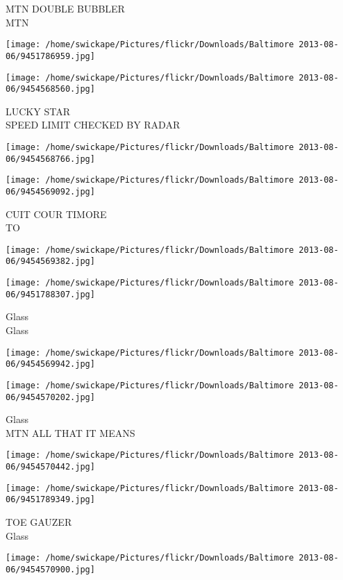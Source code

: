 \documentclass[10pt,letterpaper]{article}
\begin{document}
MTN DOUBLE BUBBLER\\
MTN
\pagebreak

\texttt{[image: /home/swickape/Pictures/flickr/Downloads/Baltimore 2013-08-06/9451786959.jpg]}

\vspace{0.25in}
\texttt{[image: /home/swickape/Pictures/flickr/Downloads/Baltimore 2013-08-06/9454568560.jpg]}

LUCKY STAR\\
SPEED LIMIT CHECKED BY RADAR
\pagebreak

\texttt{[image: /home/swickape/Pictures/flickr/Downloads/Baltimore 2013-08-06/9454568766.jpg]}

\vspace{0.25in}
\texttt{[image: /home/swickape/Pictures/flickr/Downloads/Baltimore 2013-08-06/9454569092.jpg]}

CUIT COUR TIMORE\\
TO
\pagebreak

\texttt{[image: /home/swickape/Pictures/flickr/Downloads/Baltimore 2013-08-06/9454569382.jpg]}

\vspace{0.25in}
\texttt{[image: /home/swickape/Pictures/flickr/Downloads/Baltimore 2013-08-06/9451788307.jpg]}

Glass\\
Glass
\pagebreak

\texttt{[image: /home/swickape/Pictures/flickr/Downloads/Baltimore 2013-08-06/9454569942.jpg]}

\vspace{0.25in}
\texttt{[image: /home/swickape/Pictures/flickr/Downloads/Baltimore 2013-08-06/9454570202.jpg]}

Glass\\
MTN ALL THAT IT MEANS
\pagebreak

\texttt{[image: /home/swickape/Pictures/flickr/Downloads/Baltimore 2013-08-06/9454570442.jpg]}

\vspace{0.25in}
\texttt{[image: /home/swickape/Pictures/flickr/Downloads/Baltimore 2013-08-06/9451789349.jpg]}

TOE GAUZER\\
Glass
\pagebreak

\texttt{[image: /home/swickape/Pictures/flickr/Downloads/Baltimore 2013-08-06/9454570900.jpg]}
\end{document}
